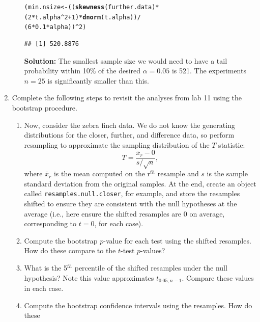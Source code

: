 \documentclass{article}\usepackage[]{graphicx}\usepackage[]{xcolor}
\makeatletter
\newcommand{\hlnum}[1]{\textcolor[rgb]{0.686,0.059,0.569}{#1}}%
\newcommand{\hlopt}[1]{\textcolor[rgb]{0,0,0}{#1}}%
\newcommand{\hldef}[1]{\textcolor[rgb]{0.345,0.345,0.345}{#1}}%
\newcommand{\hlkwb}[1]{\textcolor[rgb]{0.69,0.353,0.396}{#1}}%
\newcommand{\hlkwd}[1]{\textcolor[rgb]{0.737,0.353,0.396}{\textbf{#1}}}%
\newenvironment{kframe}{%
 \def\at@end@of@kframe{}%
 \ifinner\ifhmode%
  \def\at@end@of@kframe{\end{minipage}}%
  \begin{minipage}{\columnwidth}%
 \fi\fi%
 \def\FrameCommand##1{\hskip\@totalleftmargin \hskip-\fboxsep
 \colorbox{shadecolor}{##1}\hskip-\fboxsep
     \hskip-\linewidth \hskip-\@totalleftmargin \hskip\columnwidth}%
 \MakeFramed {\advance\hsize-\width
   \@totalleftmargin\z@ \linewidth\hsize
   \@setminipage}}%
 {\par\unskip\endMakeFramed%
 \at@end@of@kframe}
\newenvironment{knitrout}{}{} %
\makeatother
\begin{document}
\begin{enumerate}
\begin{enumerate}
\begin{knitrout}
\begin{kframe}
\begin{alltt}
\hldef{(min.nsize} \hlkwb{<-} \hldef{((}\hlkwd{skewness}\hldef{(further.data)} \hlopt{*} \hldef{(}\hlnum{2}\hlopt{*}\hldef{t.alpha}\hlopt{^}\hlnum{2} \hlopt{+} \hlnum{1}\hldef{)} \hlopt{*} \hlkwd{dnorm}\hldef{(t.alpha))}\hlopt{/}
               \hldef{(}\hlnum{6} \hlopt{*} \hlnum{0.1}\hlopt{*} \hldef{alpha))}\hlopt{^}\hlnum{2}\hldef{)}
\end{alltt}
\begin{verbatim}
## [1] 520.8876
\end{verbatim}
\end{kframe}
\end{knitrout}
\textbf{Solution:} The smallest sample size we would need to have a tail probability within 10\% of the desired $\alpha=0.05$ is 521. The experiments $n = 25$ is significantly smaller than this. 
\end{enumerate}
\item Complete the following steps to revisit the analyses from lab 11 using the
bootstrap procedure.
\begin{enumerate}
\item Now, consider the zebra finch data. We do not know the generating distributions
for the closer, further, and difference data, so perform resampling to approximate the 
sampling distribution of the $T$ statistic:
  \[T = \frac{\bar{x}_r - 0}{s/\sqrt{n}},\]
  where $\bar{x}_r$ is the mean computed on the r$^{th}$ resample and $s$ is the
  sample standard deviation from the original samples. At the end, create an
  object called \texttt{resamples.null.closer}, for example, and store the 
  resamples shifted to ensure they are consistent with the null hypotheses at the average 
  (i.e., here ensure the shifted resamples are 0 on average, corresponding
  to $t=0$, for each case). 
  \item Compute the bootstrap $p$-value for each test using the shifted resamples. 
  How do these compare to the $t$-test $p$-values?
    \item What is the 5$^{th}$ percentile of the shifted resamples under the null hypothesis? 
  Note this value approximates $t_{0.05, n-1}$. Compare these values in each case.
  \item Compute the bootstrap confidence intervals using the resamples. How do these 

\end{enumerate}
\end{enumerate}
\end{document}
